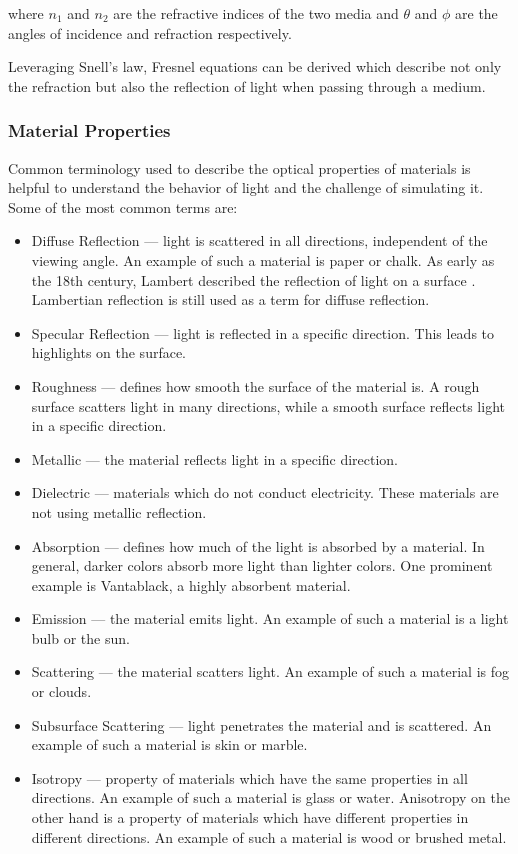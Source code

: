 where $n_1$ and $n_2$ are the refractive indices of the two media and $\theta$ and $\phi$ are the angles of incidence and refraction respectively.

Leveraging Snell's law, Fresnel equations can be derived which describe not only the refraction but also the reflection of light when passing through a medium.

\subsubsection{Material Properties}

Common terminology used to describe the optical properties of materials is helpful to understand the behavior of light and the challenge of simulating it. Some of the most common terms are:

\begin{itemize}
  \item{Diffuse Reflection} — light is scattered in all directions, independent of the viewing angle. An example of such a material is paper or chalk. As early as the 18th century, Lambert described the reflection of light on a surface \cite{lambert1760photometria}. Lambertian reflection is still used as a term for diffuse reflection.
  \item{Specular Reflection} — light is reflected in a specific direction. This leads to highlights on the surface.
  \item{Roughness} — defines how smooth the surface of the material is. A rough surface scatters light in many directions, while a smooth surface reflects light in a specific direction.
  \item{Metallic} — the material reflects light in a specific direction.
  \item{Dielectric} — materials which do not conduct electricity. These materials are not using metallic reflection.
  \item{Absorption} — defines how much of the light is absorbed by a material. In general, darker colors absorb more light than lighter colors. One prominent example is Vantablack, a highly absorbent material.
  \item{Emission} — the material emits light. An example of such a material is a light bulb or the sun.
  \item{Scattering} — the material scatters light. An example of such a material is fog or clouds.
  \item{Subsurface Scattering} — light penetrates the material and is scattered. An example of such a material is skin or marble.
  \item{Isotropy} — property of materials which have the same properties in all directions. An example of such a material is glass or water. Anisotropy on the other hand is a property of materials which have different properties in different directions. An example of such a material is wood or brushed metal.
\end{itemize}

